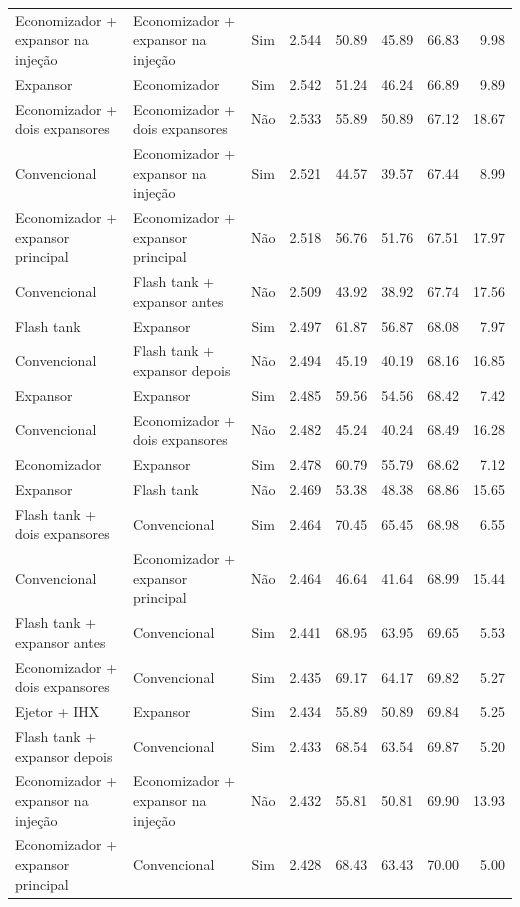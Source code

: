 {\begin{tabular}{llcrrrrr}
Economizador + expansor na injeção & Economizador + expansor na injeção & Sim & 2.544 & 50.89 & 45.89 & 66.83 & 9.98 \\
Expansor & Economizador & Sim & 2.542 & 51.24 & 46.24 & 66.89 & 9.89 \\
Economizador + dois expansores & Economizador + dois expansores & Não & 2.533 & 55.89 & 50.89 & 67.12 & 18.67 \\
Convencional & Economizador + expansor na injeção & Sim & 2.521 & 44.57 & 39.57 & 67.44 & 8.99 \\
Economizador + expansor principal & Economizador + expansor principal & Não & 2.518 & 56.76 & 51.76 & 67.51 & 17.97 \\
Convencional & Flash tank + expansor antes & Não & 2.509 & 43.92 & 38.92 & 67.74 & 17.56 \\
Flash tank & Expansor & Sim & 2.497 & 61.87 & 56.87 & 68.08 & 7.97 \\
Convencional & Flash tank + expansor depois & Não & 2.494 & 45.19 & 40.19 & 68.16 & 16.85 \\
Expansor & Expansor & Sim & 2.485 & 59.56 & 54.56 & 68.42 & 7.42 \\
Convencional & Economizador + dois expansores & Não & 2.482 & 45.24 & 40.24 & 68.49 & 16.28 \\
Economizador & Expansor & Sim & 2.478 & 60.79 & 55.79 & 68.62 & 7.12 \\
Expansor & Flash tank & Não & 2.469 & 53.38 & 48.38 & 68.86 & 15.65 \\
Flash tank + dois expansores & Convencional & Sim & 2.464 & 70.45 & 65.45 & 68.98 & 6.55 \\
Convencional & Economizador + expansor principal & Não & 2.464 & 46.64 & 41.64 & 68.99 & 15.44 \\
Flash tank + expansor antes & Convencional & Sim & 2.441 & 68.95 & 63.95 & 69.65 & 5.53 \\
Economizador + dois expansores & Convencional & Sim & 2.435 & 69.17 & 64.17 & 69.82 & 5.27 \\
Ejetor + IHX & Expansor & Sim & 2.434 & 55.89 & 50.89 & 69.84 & 5.25 \\
Flash tank + expansor depois & Convencional & Sim & 2.433 & 68.54 & 63.54 & 69.87 & 5.20 \\
Economizador + expansor na injeção & Economizador + expansor na injeção & Não & 2.432 & 55.81 & 50.81 & 69.90 & 13.93 \\
Economizador + expansor principal & Convencional & Sim & 2.428 & 68.43 & 63.43 & 70.00 & 5.00 \\

\end{tabular}}
